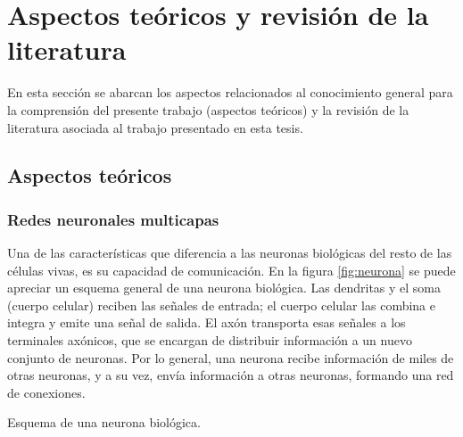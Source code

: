 \chapter{Aspectos teóricos y revisión de la literatura}

En esta sección se abarcan los aspectos relacionados al conocimiento general para la comprensión del presente trabajo (aspectos teóricos) y la revisión de la literatura asociada al trabajo presentado en esta tesis. %




\section{Aspectos teóricos}
\subsection{Redes neuronales multicapas}
Una de las características que diferencia a las neuronas biológicas del resto de las células vivas, es su capacidad de comunicación. En la figura \ref{fig:neurona} se puede apreciar un esquema general de una neurona biológica. Las dendritas y el soma (cuerpo celular) reciben las señales de entrada; el cuerpo celular las combina e integra y emite una señal de salida. El axón transporta esas señales a los terminales axónicos, que se encargan de distribuir información a un nuevo conjunto de neuronas. Por lo general, una neurona recibe información de miles de otras neuronas, y a su vez, envía información a otras neuronas, formando una red de conexiones.
\begin{imagen}
	\scalebox{0.07}{}
	\caption{Esquema de una neurona biológica.}
	\label{fig:neurona}
\end{imagen}

